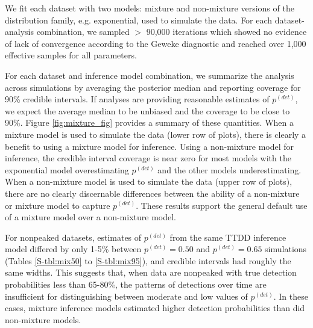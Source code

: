 \documentclass[12pt]{article}
\newcommand{\pdet}{p^{(det)}}
\begin{document}
We fit each dataset with two models: mixture and non-mixture versions of the distribution family, e.g. exponential, used to simulate the data.
For each dataset-analysis combination, we sampled $>$ 90,000 iterations which showed no evidence of lack of convergence according to the Geweke diagnostic and reached over 1,000 effective samples for all parameters. 

For each dataset and inference model combination, we summarize the analysis across simulations by averaging the posterior median and reporting coverage for 90\% credible intervals.
If analyses are providing reasonable estimates of $\pdet$, we expect the average median to be unbiased and the coverage to be close to 90\%.
Figure \ref{fig:mixture_fig} provides a summary of these quantities. 
When a mixture model is used to simulate the data (lower row of plots), there is clearly a benefit to using a mixture model for inference.  
Using a non-mixture model for inference, the credible interval coverage is near zero for most models with the exponential model overestimating $\pdet$ and the other models underestimating. 
When a non-mixture model is used to simulate the data (upper row of plots), there are no clearly discernable differences between the ability of a non-mixture or mixture model to capture $\pdet$. 
These results support the general default use of a mixture model over a non-mixture model.

For nonpeaked datasets, estimates of $\pdet$ from the same TTDD inference model differed by only 1-5\% between $\pdet=0.50$ and $\pdet=0.65$ simulations (Tables \ref{S-tbl:mix50} to \ref{S-tbl:mix95}), and credible intervals had roughly the same widths.
This suggests that, when data are nonpeaked with true detection probabilities less than 65-80\%, the patterns of detections over time are insufficient for distinguishing between moderate and low values of $\pdet$.
In these cases, mixture inference models estimated higher detection probabilities than did non-mixture models.
\end{document}
